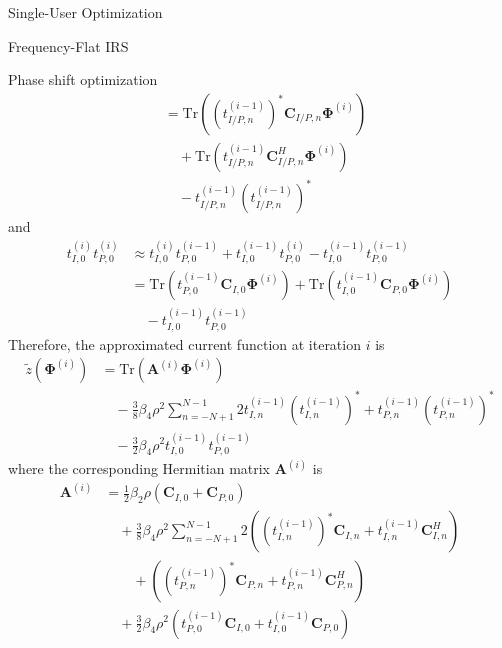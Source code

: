 \documentclass{IEEEtran}
\begin{document}
\begin{section}{Single-User Optimization}
\begin{subsection}{Frequency-Flat IRS}
\begin{subsubsection}{Phase shift optimization}
\begin{equation}
\begin{split}
					& = \mathrm{Tr}\left((t_{I/P,n}^{(i-1)})^*\boldsymbol{C}_{I/P,n}\boldsymbol{\Phi}^{(i)}\right)\\
					& \quad + \mathrm{Tr}\left(t_{I/P,n}^{(i-1)}\boldsymbol{C}_{I/P,n}^H\boldsymbol{\Phi}^{(i)}\right)\\
					& \quad- t_{I/P,n}^{(i-1)} (t_{I/P,n}^{(i-1)})^*
				\end{split}
			\end{equation}
			and
			\begin{equation}
				\begin{split}
					t_{I,0}^{(i)} t_{P,0}^{(i)}
					& \approx t_{I,0}^{(i)} t_{P,0}^{(i-1)} + t_{I,0}^{(i-1)} t_{P,0}^{(i)} - t_{I,0}^{(i-1)} t_{P,0}^{(i-1)}\\
					& = \mathrm{Tr}(t_{P,0}^{(i-1)}\boldsymbol{C}_{I,0}\boldsymbol{\Phi}^{(i)}) + \mathrm{Tr}(t_{I,0}^{(i-1)}\boldsymbol{C}_{P,0}\boldsymbol{\Phi}^{(i)})\\
					& \quad - t_{I,0}^{(i-1)} t_{P,0}^{(i-1)}
				\end{split}
			\end{equation}
			Therefore, the approximated current function at iteration $i$ is
			\begin{equation}\label{eq:z_irs_approx}
				\begin{split}
					\tilde{z}(\boldsymbol{\Phi}^{(i)})
					& = \mathrm{Tr}(\boldsymbol{A}^{(i)}\boldsymbol{\Phi}^{(i)}) \\
					& \quad - \frac{3}{8} \beta_4 \rho^2 \sum_{n=-N+1}^{N-1} 2t_{I,n}^{(i-1)} (t_{I,n}^{(i-1)})^* + t_{P,n}^{(i-1)} (t_{P,n}^{(i-1)})^* \\
					& \quad - \frac{3}{2} \beta_4 \rho^2 t_{I,0}^{(i-1)} t_{P,0}^{(i-1)}
				\end{split}
			\end{equation}
			where the corresponding Hermitian matrix $\boldsymbol{A}^{(i)}$ is
			\begin{equation}\label{eq:A}
				\begin{split}
					\boldsymbol{A}^{(i)}
					& = \frac{1}{2} \beta_2 \rho (\boldsymbol{C}_{I,0}+\boldsymbol{C}_{P,0})\\
					& \quad+ \frac{3}{8} \beta_4 \rho^2 \sum_{n=-N+1}^{N-1} 2\left((t_{I,n}^{(i-1)})^*\boldsymbol{C}_{I,n} + t_{I,n}^{(i-1)}\boldsymbol{C}_{I,n}^H\right)\\
					& \quad \quad + \left((t_{P,n}^{(i-1)})^*\boldsymbol{C}_{P,n} + t_{P,n}^{(i-1)}\boldsymbol{C}_{P,n}^H\right)\\
					& \quad+ \frac{3}{2} \beta_4 \rho^2 (t_{P,0}^{(i-1)}\boldsymbol{C}_{I,0} + t_{I,0}^{(i-1)}\boldsymbol{C}_{P,0})

\end{split}
\end{equation}
\end{subsubsection}
\end{subsection}
\end{section}
\end{document}
